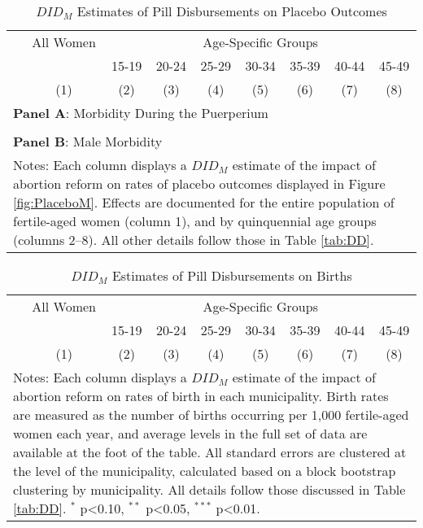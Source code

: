 \documentclass[12pt]{article}
\begin{document}
\begin{landscape}
  \begin{table}[htpb!]
    \centering
    \caption{$DID_M$ Estimates of Pill Disbursements on Placebo Outcomes}
    \label{tab:DDplacebo}
    \begin{tabular}{lcccccccc}\toprule
      &All Women&\multicolumn{7}{c}{Age-Specific Groups} \\ \cmidrule(r){3-9}
      &&15-19&20-24&25-29&30-34&35-39&40-44&45-49 \\
      &(1)&(2)&(3)&(4)&(5)&(6)&(7)&(8) \\ \midrule
      \multicolumn{9}{l}{\textbf{Panel A}: Morbidity During the Puerperium} \\
       \\
      \multicolumn{9}{l}{\textbf{Panel B}: Male Morbidity} \\
      
      \bottomrule
      \multicolumn{9}{p{19.8cm}}{{\footnotesize Notes: Each column displays a $DID_M$ estimate of the impact of abortion reform on rates of placebo outcomes displayed in Figure \ref{fig:PlaceboM}. Effects are documented for the entire population of fertile-aged women (column 1), and by quinquennial age groups (columns 2--8). All other details follow those in Table \ref{tab:DD}.}}
    \end{tabular}
  \end{table}
\end{landscape}




\begin{landscape}
  \begin{table}
    \centering
    \caption{$DID_M$ Estimates of Pill Disbursements on Births}
    \label{tab:DDbirth}
    \begin{tabular}{lcccccccc}\toprule
      &All Women&\multicolumn{7}{c}{Age-Specific Groups} \\ \cmidrule(r){3-9}
      &&15-19&20-24&25-29&30-34&35-39&40-44&45-49 \\
      &(1)&(2)&(3)&(4)&(5)&(6)&(7)&(8) \\ \midrule
      
      \bottomrule
      \multicolumn{9}{p{19.1cm}}{{\footnotesize Notes: Each column displays a $DID_M$ estimate of the impact of abortion reform on rates of birth in each municipality.  Birth rates are measured as the number of births occurring per 1,000 fertile-aged women each year, and average levels in the full set of data are available at the foot of the table.  All standard errors are clustered at the level of the municipality, calculated based on a block bootstrap clustering by municipality.  All details follow those discussed in Table \ref{tab:DD}. $^{*}$ p<0.10, $^{**}$ p<0.05, $^{***}$ p<0.01.}}
    \end{tabular}
  \end{table}
\end{landscape}
\end{document}
